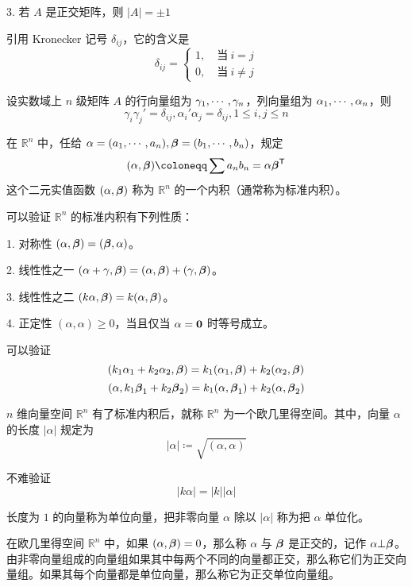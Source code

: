 3. 若 $A$ 是正交矩阵，则 $|A|=\pm 1$


引用 Kronecker 记号 $\delta_{ij}$，它的含义是
\[\delta_{ij}=\begin{cases}
		1,\quad \text{当}\ i = j \\
		0,\quad \text{当}\ i \ne j
	\end{cases}\]

\begin{theorem}
	设实数域上 $n$ 级矩阵 $A$ 的行向量组为 $\gamma_1,\cdots,\gamma_n$，列向量组为 $\alpha_1,\cdots,\alpha_n$，则
	\[\gamma_i\gamma_j'=\delta_{ij},\alpha_i'\alpha_j=\delta_{ij},1 \leqslant i,j \leqslant n\]
\end{theorem}

\begin{definition}
	在 $\mathbb{R}^n$ 中，任给 $\alpha = (a_1,\cdots,a_n),\boldsymbol{\beta}=(b_1,\cdots,b_n)$，规定
	\[(\alpha,\vbf{\beta}) \coloneqq  \sum a_nb_n = \alpha\transpose{\vbf{\beta}}\]
	这个二元实值函数 $(\alpha,\boldsymbol{\beta})$ 称为 $\mathbb{R}^n$ 的一个内积（通常称为标准内积）。
\end{definition}

可以验证 $\mathbb{R}^n$ 的标准内积有下列性质：

1. 对称性 $(\alpha,\boldsymbol{\beta}) = (\boldsymbol{\beta},\alpha)$。

2. 线性性之一 $(\alpha+\gamma,\boldsymbol{\beta}) = (\alpha,\boldsymbol{\beta}) + (\gamma,\boldsymbol{\beta})$。

3. 线性性之二 $(k\alpha,\boldsymbol{\beta}) = k(\alpha,\boldsymbol{\beta})$。

4. 正定性 $(\alpha,\alpha) \geqslant 0$，当且仅当 $\alpha=\boldsymbol{0}$ 时等号成立。

可以验证
\[(k_1\alpha_1+k_2\alpha_2, \boldsymbol{\beta}) = k_1(\alpha_1,\boldsymbol{\beta}) + k_2(\alpha_2,\boldsymbol{\beta})\]
\[(\alpha, k_1\boldsymbol{\beta}_1+k_2\boldsymbol{\beta}_2) = k_1(\alpha,\boldsymbol{\beta}_1) + k_2(\alpha,\boldsymbol{\beta}_2)\]

$n$ 维向量空间 $\mathbb{R}^n$ 有了标准内积后，就称 $\mathbb{R}^n$ 为一个欧几里得空间。其中，向量 $\alpha$ 的长度 $|\alpha|$ 规定为
\[|\alpha| \coloneqq  \sqrt{(\alpha,\alpha)}\]

不难验证
\[|k\alpha| = |k||\alpha|\]

长度为 $1$ 的向量称为单位向量，把非零向量 $\alpha$ 除以 $|\alpha|$ 称为把 $\alpha$ 单位化。

在欧几里得空间 $\mathbb{R}^n$ 中，如果 $(\alpha,\boldsymbol{\beta})=0$，那么称 $\alpha$ 与 $\boldsymbol{\beta}$ 是正交的，记作 $\alpha \bot \boldsymbol{\beta}$。由非零向量组成的向量组如果其中每两个不同的向量都正交，那么称它们为正交向量组。如果其每个向量都是单位向量，那么称它为正交单位向量组。

